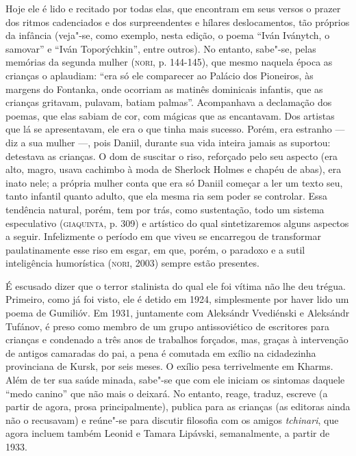 Hoje ele é lido e recitado por todas elas, que encontram em seus versos
o prazer dos ritmos cadenciados e dos surpreendentes e hílares
deslocamentos, tão próprios da infância (veja"-se, como exemplo, nesta
edição, o poema ``Iván Iványtch, o samovar'' e ``Iván Toporýchkin'',
entre outros). No entanto, sabe"-se, pelas memórias da segunda mulher
(\textsc{nori}, p. 144-145), que mesmo naquela época as crianças o
aplaudiam: ``era só ele comparecer ao Palácio dos Pioneiros, às margens
do Fontanka, onde ocorriam as matinês dominicais infantis, que as
crianças gritavam, pulavam, batiam palmas''. Acompanhava a declamação
dos poemas, que elas sabiam de cor, com mágicas que as encantavam. Dos
artistas que lá se apresentavam, ele era o que tinha mais sucesso.
Porém, era estranho --- diz a sua mulher ---, pois Daniil, durante sua
vida inteira jamais as suportou: detestava as crianças. O dom de
suscitar o riso, reforçado pelo seu aspecto (era alto, magro, usava
cachimbo à moda de Sherlock Holmes e chapéu de abas), era inato nele; a
própria mulher conta que era só Daniil começar a ler um texto seu, tanto
infantil quanto adulto, que ela mesma ria sem poder se controlar. Essa
tendência natural, porém, tem por trás, como sustentação, todo um
sistema especulativo (\textsc{giaquinta}, p. 309) e artístico do qual
sintetizaremos alguns aspectos a seguir. Infelizmente o período em que
viveu se encarregou de transformar paulatinamente esse riso em esgar, em
que, porém, o paradoxo e a sutil inteligência humorística
(\textsc{nori}, 2003) sempre estão presentes.

É escusado dizer que o terror stalinista do qual ele foi vítima não lhe
deu trégua. Primeiro, como já foi visto, ele é detido em 1924,
simplesmente por haver lido um poema de Gumilióv. Em 1931, juntamente
com Aleksándr Vvediénski e Aleksándr Tufánov, é preso como membro de um
grupo antissoviético de escritores para crianças e condenado a três anos
de trabalhos forçados, mas, graças à intervenção de antigos camaradas do
pai, a pena é comutada em exílio na cidadezinha provinciana de Kursk,
por seis meses. O exílio pesa terrivelmente em Kharms. Além de ter sua
saúde minada, sabe"-se que com ele iniciam os sintomas daquele ``medo
canino'' que não mais o deixará. No entanto, reage, traduz, escreve (a
partir de agora, prosa principalmente), publica para as crianças (as
editoras ainda não o recusavam) e reúne"-se para discutir filosofia com
os amigos \emph{tchinari}, que agora incluem também Leonid e Tamara
Lipávski, semanalmente, a partir de 1933.

